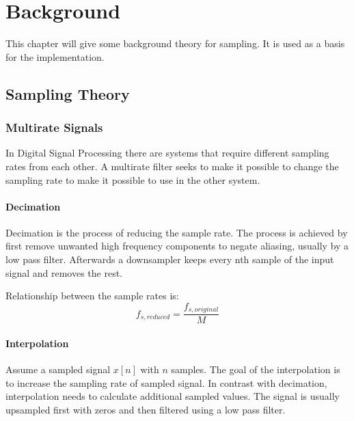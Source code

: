 \chapter{Background}
\label{chap:background}
This chapter will give some background theory for sampling. It is used as a basis for the implementation. 


\section{Sampling Theory}



\subsection{Multirate Signals}
\label{sec:multirate}
In Digital Signal Processing there are systems that require different sampling rates from each other. A multirate filter seeks to make it possible to change the sampling rate to make it possible to use in the other system. 

\subsubsection{Decimation}
Decimation is the process of reducing the sample rate. The process is achieved by first remove unwanted high frequency components to negate aliasing, usually by a low pass filter. Afterwards a downsampler keeps every nth sample of the input signal and removes the rest.\cite{harris_multirate_2022} 

Relationship between the sample rates is:
\begin{equation}
    f_{s,reduced} = \frac{f_{s,original}}{M}
\end{equation}
\cite{lyons_understanding_2011}


\subsubsection{Interpolation}
Assume a sampled signal $x[n]$ with $n$ samples. The goal of the interpolation is to increase the sampling rate of sampled signal. In contrast with decimation, interpolation needs to calculate additional sampled values. The signal is usually upsampled first with zeros and then filtered using a low pass filter.


